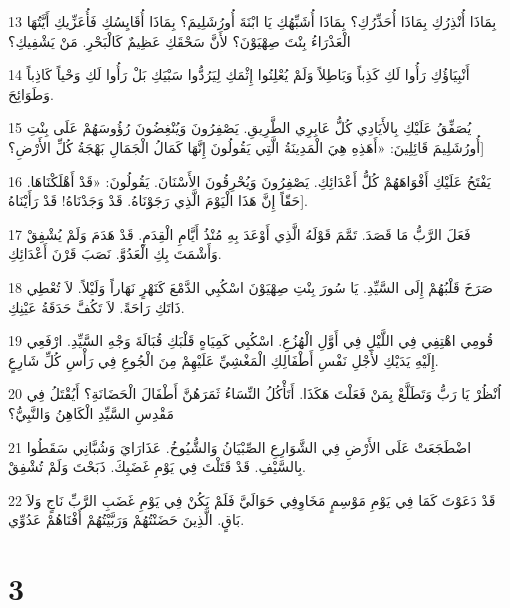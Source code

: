 \par 13 بِمَاذَا أُنْذِرُكِ بِمَاذَا أُحَذِّرُكِ؟ بِمَاذَا أُشَبِّهُكِ يَا ابْنَةَ أُورُشَلِيمَ؟ بِمَاذَا أُقَايِسُكِ فَأُعَزِّيكِ أَيَّتُهَا الْعَذْرَاءُ بِنْتَ صِهْيَوْنَ؟ لأَنَّ سَحْقَكِ عَظِيمٌ كَالْبَحْرِ. مَنْ يَشْفِيكِ؟
\par 14 أَنْبِيَاؤُكِ رَأُوا لَكِ كَذِباً وَبَاطِلاً وَلَمْ يُعْلِنُوا إِثْمَكِ لِيَرُدُّوا سَبْيَكِ بَلْ رَأُوا لَكِ وَحْياً كَاذِباً وَطَوَائِحَ.
\par 15 يُصَفِّقُ عَلَيْكِ بِالأَيَادِي كُلُّ عَابِرِي الطَّرِيقِ. يَصْفِرُونَ وَيُنْغِضُونَ رُؤُوسَهُمْ عَلَى بِنْتِ أُورُشَلِيمَ قَائِلِينَ: «أَهَذِهِ هِيَ الْمَدِينَةُ الَّتِي يَقُولُونَ إِنَّهَا كَمَالُ الْجَمَالِ بَهْجَةُ كُلِّ الأَرْضِ؟]
\par 16 يَفْتَحُ عَلَيْكِ أَفْوَاهَهُمْ كُلُّ أَعْدَائِكِ. يَصْفِرُونَ وَيُحْرِقُونَ الأَسْنَانَ. يَقُولُونَ: «قَدْ أَهْلَكْنَاهَا. حَقّاً إِنَّ هَذَا الْيَوْمَ الَّذِي رَجَوْنَاهُ. قَدْ وَجَدْنَاهُ! قَدْ رَأَيْنَاهُ].
\par 17 فَعَلَ الرَّبُّ مَا قَصَدَ. تَمَّمَ قَوْلَهُ الَّذِي أَوْعَدَ بِهِ مُنْذُ أَيَّامِ الْقِدَمِ. قَدْ هَدَمَ وَلَمْ يُشْفِقْ وَأَشْمَتَ بِكِ الْعَدُوَّ. نَصَبَ قَرْنَ أَعْدَائِكِ.
\par 18 صَرَخَ قَلْبُهُمْ إِلَى السَّيِّدِ. يَا سُورَ بِنْتِ صِهْيَوْنَ اسْكُبِي الدَّمْعَ كَنَهْرٍ نَهَاراً وَلَيْلاً. لاَ تُعْطِي ذَاتَكِ رَاحَةً. لاَ تَكُفَّ حَدَقَةُ عَيْنِكِ.
\par 19 قُومِي اهْتِفِي فِي اللَّيْلِ فِي أَوَّلِ الْهُزُعِ. اسْكُبِي كَمِيَاهٍ قَلْبَكِ قُبَالَةَ وَجْهِ السَّيِّدِ. ارْفَعِي إِلَيْهِ يَدَيْكِ لأَجْلِ نَفْسِ أَطْفَالِكِ الْمَغْشِيِّ عَلَيْهِمْ مِنَ الْجُوعِ فِي رَأْسِ كُلِّ شَارِعٍ.
\par 20 اُنْظُرْ يَا رَبُّ وَتَطَلَّعْ بِمَنْ فَعَلْتَ هَكَذَا. أَتَأْكُلُ النِّسَاءُ ثَمَرَهُنَّ أَطْفَالَ الْحَضَانَةِ؟ أَيُقْتَلُ فِي مَقْدِسِ السَّيِّدِ الْكَاهِنُ وَالنَّبِيُّ؟
\par 21 اضْطَجَعَتْ عَلَى الأَرْضِ فِي الشَّوَارِعِ الصِّبْيَانُ وَالشُّيُوخُ. عَذَارَايَ وَشُبَّانِي سَقَطُوا بِالسَّيْفِ. قَدْ قَتَلْتَ فِي يَوْمِ غَضَبِكَ. ذَبَحْتَ وَلَمْ تُشْفِقْ.
\par 22 قَدْ دَعَوْتَ كَمَا فِي يَوْمِ مَوْسِمٍ مَخَاوِفِي حَوَالَيَّ فَلَمْ يَكُنْ فِي يَوْمِ غَضَبِ الرَّبِّ نَاجٍ وَلاَ بَاقٍ. الَّذِينَ حَضَنْتُهُمْ وَرَبَّيْتُهُمْ أَفْنَاهُمْ عَدُوِّي.

\chapter{3}

